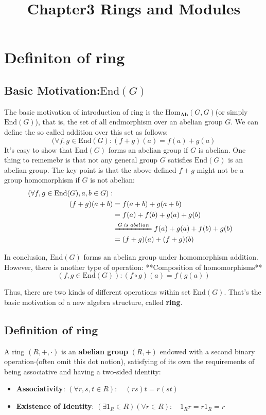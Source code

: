 \documentclass[a4paper, pdf, 11.5pt]{article}
\date{}
\title{Chapter3 Rings and Modules}
\begin{document}
\maketitle
\tableofcontents
\section{Definiton of ring}
\subsection{Basic Motivation:$\mbox{End}(G)$}
The basic motivation of introduction of ring is the $\mbox{Hom}_{\mathbf{Ab}}(G, G)$(or simply $\mbox{End}(G)$), that is, the set of all endmorphism over an abelian group $G$. We can define the so called addition over this set as follows:
$$
(\forall f,g\in \mbox{End}(G): (f+g)(a) = f(a) + g(a)
$$
It's easy to show that $\mbox{End}(G)$ forms an abelian group  if $G$ is abelian. One thing to rememebr is that not any general group $G$ satisfies $\mbox{End}(G)$ is an abelian group. The key point is that the above-defined $f+g$ might not be a group homomorphism if $G$ is not abelian:
$$
\begin{aligned}
(\forall f,g\in \mbox{End}(G), a,b\in G):\\(f+g)(a+b) &= f(a+b) + g(a+b)\\
&= f(a) + f(b) + g(a) + g(b)\\
&\xlongequal{G\;is\;abelian} f(a) + g(a) + f(b) + g(b)\\
&= (f+g)(a) + (f+g)(b)
\end{aligned} 
$$

In conclusion, $\mbox{End}(G)$ forms an abelian group under homomorphism addition. However, there is another type of operation: **Composition of homomorphisms**
$$
(f,g\in \mbox{End}(G)): (f\circ g)(a) = f(g(a))
$$

Thus, there are two kinds of different operations within set $\mbox{End}(G)$. That's the basic motivation of a new algebra structure, called \textbf{ring}.

\subsection{Definition of ring}
A ring $(R, +, ·)$ is an \textbf{abelian group} $(R, +)$ endowed with a second binary operation$·$(often omit this dot notion), satisfying of its own the requirements of being associative and having a two-sided identity:
\begin{itemize}
  \item \textbf{Associativity}: $(\forall r,s,t\in R):\quad (rs)t=r(st)$
  \item \textbf{Existence of Identity}: $(\exists 1_{R}\in R)(\forall r\in R):\quad 1_{R}r=r1_{R} = r$
\end{itemize}
\end{document}
